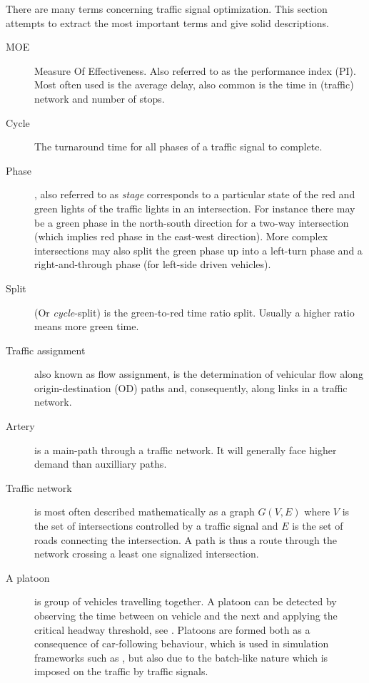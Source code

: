 \label{vocabulary}
There are many terms concerning traffic signal optimization. This section attempts to extract the most important terms and give solid descriptions.


\begin{description}

	\item[MOE] Measure Of Effectiveness. Also referred to as the performance index (PI).
	Most often used is the average delay, also common is the time in (traffic) network and number of stops. 
			
	\item[Cycle] The turnaround time for all phases of a traffic signal to complete.
	
	\item[Phase], also referred to as \textit{stage} corresponds to a particular state of the red and green lights of the traffic lights in an intersection. 
	For instance there may be a green phase in the north-south direction for a two-way intersection (which implies red phase in the east-west direction).
	More complex intersections may also split the green phase up into a left-turn phase and a right-and-through phase (for left-side driven vehicles).
	
	\item[Split] (Or \textit{cycle}-split) is the green-to-red time ratio split. Usually a higher ratio means more green time.
	
	\item[Traffic assignment] also known as flow assignment, is the determination of vehicular flow along origin-destination (OD) paths and, consequently, along links in a traffic network. 

\item[Artery] is a main-path through a traffic network. It will generally face higher demand than auxilliary paths.

\item[Traffic network] is most often described mathematically as a graph $G(V,E)$ where $V$ is the set of intersections controlled by a traffic signal and $E$ is the set of roads connecting the intersection. A path is thus a route through the network crossing a least one signalized intersection.

	\item[A platoon] is group of vehicles travelling together. A platoon can be detected by observing the time between on vehicle and the next and applying the critical headway threshold, see \cite[sct. 2]{25}. 
Platoons are formed both as a consequence of car-following behaviour, which is used in simulation frameworks such as \cite{treiber-2000-62}, but also due to the batch-like nature which is imposed on the traffic by traffic signals.


\end{description}

